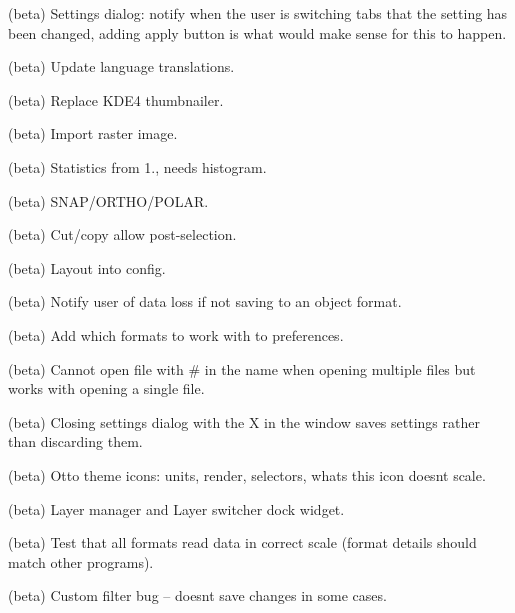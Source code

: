 \begin{DoxyRefList}
\label{todo__todo000361}%
%
(beta) Settings dialog\+: notify when the user is switching tabs that the setting has been changed, adding apply button is what would make sense for this to happen.

\label{todo__todo000362}%
%
(beta) Update language translations.

\label{todo__todo000363}%
%
(beta) Replace KDE4 thumbnailer.

\label{todo__todo000364}%
%
(beta) Import raster image.

\label{todo__todo000365}%
%
(beta) Statistics from 1., needs histogram.

\label{todo__todo000366}%
%
(beta) SNAP/\+ORTHO/\+POLAR.

\label{todo__todo000367}%
%
(beta) Cut/copy allow post-\/selection.

\label{todo__todo000368}%
%
(beta) Layout into config.

\label{todo__todo000369}%
%
(beta) Notify user of data loss if not saving to an object format.

\label{todo__todo000370}%
%
(beta) Add which formats to work with to preferences.

\label{todo__todo000371}%
%
(beta) Cannot open file with {\ttfamily \#} in the name when opening multiple files but works with opening a single file.

\label{todo__todo000372}%
%
(beta) Closing settings dialog with the X in the window saves settings rather than discarding them.

\label{todo__todo000373}%
%
(beta) Otto theme icons\+: units, render, selectors, what\textquotesingle{}s this icon doesn\textquotesingle{}t scale.

\label{todo__todo000374}%
%
(beta) Layer manager and Layer switcher dock widget.

\label{todo__todo000375}%
%
(beta) Test that all formats read data in correct scale (format details should match other programs).

\label{todo__todo000376}%
%
(beta) Custom filter bug -- doesn\textquotesingle{}t save changes in some cases.


\end{DoxyRefList}
